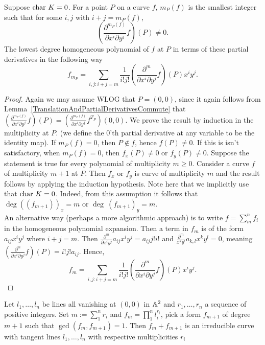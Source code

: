     \begin{proposition}
        Suppose $\mathrm{char} \ K =0$. For a point $P$ on a curve $f$, $m_P(f)$ is the smallest integer such that for some $i,j$ with $i+j=m_P(f)$, 
        $$\left(\frac{\partial^{m_P(f)}}{\partial x^i\partial y^j}f\right)(P) \neq 0.$$
        The lowest degree homogeneous polynomial of $f$ at $P$ in terms of these partial derivatives in the following way
        $$f_{m_P} = \sum_{i,j : i+j=m} \frac{1}{i!j!}\left(\frac{\partial^m}{\partial x^i\partial y^j}f\right)(P)x^{i}y^j.$$
    \end{proposition}
    \begin{proof}
        Again we may assume WLOG that $P=(0,0)$, since it again follows from Lemma~\ref{TranslationAndPartialDerivativesCommute} that $\left(\frac{\partial^{m_P(f)}}{\partial x^i\partial y^j}f\right)(P)=\left(\frac{\partial^{m_P(f)}}{\partial x^i\partial y^j}f^{T_P}\right)(0,0)$.
        We prove the result by induction in the multiplicity at $P$. (we define the $0$'th partial derivative at any variable to be the identity map). If $m_P(f)=0$, then $P\notin f$, hence $f(P)\neq 0$. If this is isn't satisfactory, when $m_P(f)=0$, then $f_{x}(P)\neq 0$ or $f_y(P)\neq 0$. Suppose the statement is true for every polynomial of multiplicity $m\geq 0$. Consider a curve $f$ of multiplicity $m+1$ at $P$. Then $f_x$ or $f_y$ is curve of multiplicity $m$ and the result follows by applying the induction hypothesis. Note here that we implicitly use that $\mathrm{char} \ K = 0$. Indeed, from this assumption it follows that $\deg ((f_{m+1}))_x=m$ or $\deg\ (f_{m+1})_y=m$.\\
        An alternative way (perhaps a more algorithmic approach) is to write $f = \sum_m^nf_i$ in the homogeneous polynomial expansion. Then a term in $f_m$ is of the form $a_{ij}x^iy^j$ where $i+j=m$. Then $\frac{\partial^m}{\partial x^iy^j}a_{ij}x^iy^j= a_{ij}j!i!$ and $\frac{\partial^m}{x^ky^l} a_{k,l}x^ky^l = 0$, meaning $\left(\frac{\partial^m}{\partial x^i\partial y^j} f\right)(P)=i!j!a_{ij}$. Hence, 
        $$f_m = \sum_{i,j : i+j=m} \frac{1}{i!j!}\left(\frac{\partial^m}{\partial x^i\partial y^j}f\right)(P)x^{i}y^j.$$
    \end{proof}
    \begin{proposition}
        Let $l_1,\dots,l_n$ be lines all vanishing at $(0,0)$ in $\mathbb{A}^2$ and $r_1,\dots,r_n$ a sequence of positive integers. Set $m:=\sum_1^n r_i$ and $f_m = \prod_1^n l_i^{r_i}$, pick a form $f_{m+1}$ of degree $m+1$ such that $\gcd(f_m,f_{m+1})=1$. Then $f_m+f_{m+1}$ is an irreducible curve with tangent lines $l_1,\dots,l_n$ with respective multiplicities $r_i$
    \end{proposition}
